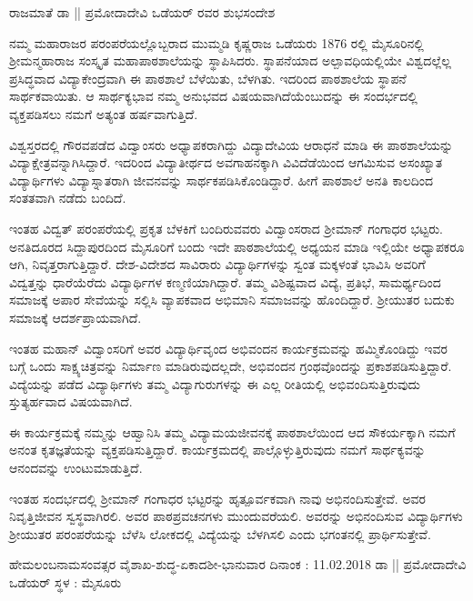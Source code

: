ರಾಜಮಾತೆ ಡಾ || ಪ್ರಮೋದಾದೇವಿ ಒಡೆಯರ್ ರವರ ಶುಭಸಂದೇಶ
	
ನಮ್ಮ ಮಹಾರಾಜರ ಪರಂಪರೆಯಲ್ಲೊಬ್ಬರಾದ ಮುಮ್ಮಡಿ ಕೃಷ್ಣರಾಜ ಒಡೆಯರು 1876 ರಲ್ಲಿ ಮೈಸೂರಿನಲ್ಲಿ ಶ್ರೀಮನ್ಮಹಾರಾಜ ಸಂಸ್ಕೃತ ಮಹಾಪಾಠಶಾಲೆಯನ್ನು ಸ್ಥಾಪಿಸಿದರು. ಸ್ಥಾಪನೆಯಾದ ಅಲ್ಪಾವಧಿಯಲ್ಲಿಯೇ ವಿಶ್ವದಲ್ಲೆಲ್ಲ ಪ್ರಸಿದ್ಧವಾದ ವಿದ್ಯಾಕೇಂದ್ರವಾಗಿ ಈ ಪಾಠಶಾಲೆ ಬೆಳೆಯಿತು, ಬೆಳಗಿತು. ಇದರಿಂದ ಪಾಠಶಾಲೆಯ ಸ್ಥಾಪನೆ ಸಾರ್ಥಕವಾಯಿತು. ಆ ಸಾರ್ಥಕ್ಯಭಾವ ನಮ್ಮ ಅನುಭವದ ವಿಷಯವಾಗಿದೆಯೆಂಬುದನ್ನು ಈ ಸಂದರ್ಭದಲ್ಲಿ ವ್ಯಕ್ತಪಡಿಸಲು ನಮಗೆ ಅತ್ಯಂತ ಹರ್ಷವಾಗುತ್ತಿದೆ.

ವಿಶ್ವಸ್ತರದಲ್ಲಿ ಗೌರವಪಡೆದ ವಿದ್ವಾಂಸರು ಅಧ್ಯಾಪಕರಾಗಿದ್ದು ವಿದ್ಯಾದೇವಿಯ ಆರಾಧನೆ ಮಾಡಿ ಈ ಪಾಠಶಾಲೆಯನ್ನು ವಿದ್ಯಾಕ್ಷೇತ್ರವನ್ನಾಗಿಸಿದ್ದಾರೆ. ಇದರಿಂದ ವಿದ್ಯಾತೀರ್ಥದ ಅವಗಾಹನಕ್ಕಾಗಿ ವಿವಿದೆಡೆಯಿಂದ ಆಗಮಿಸುವ ಅಸಂಖ್ಯಾತ ವಿದ್ಯಾರ್ಥಿಗಳು ವಿದ್ಯಾಸ್ನಾತರಾಗಿ ಜೀವನವನ್ನು ಸಾರ್ಥಕಪಡಿಸಿಕೊಂಡಿದ್ದಾರೆ. ಹೀಗೆ ಪಾಠಶಾಲೆ ಅನತಿ ಕಾಲದಿಂದ ಸಂತತವಾಗಿ ನಡೆದು ಬಂದಿದೆ.

ಇಂತಹ ವಿದ್ವತ್ ಪರಂಪರೆಯಲ್ಲಿ ಪ್ರಕೃತ ಬೆಳಕಿಗೆ ಬಂದಿರುವವರು ವಿದ್ವಾಂಸರಾದ ಶ್ರೀಮಾನ್ ಗಂಗಾಧರ ಭಟ್ಟರು.  ಅನತಿದೂರದ ಸಿದ್ದಾಪುರದಿಂದ ಮೈಸೂರಿಗೆ ಬಂದು ಇದೇ ಪಾಠಶಾಲೆಯಲ್ಲಿ ಅಧ್ಯಯನ ಮಾಡಿ ಇಲ್ಲಿಯೇ ಅಧ್ಯಾಪಕರೂ ಆಗಿ, ನಿವೃತ್ತರಾಗುತ್ತಿದ್ದಾರೆ. ದೇಶ-ವಿದೇಶದ ಸಾವಿರಾರು ವಿದ್ಯಾರ್ಥಿಗಳನ್ನು ಸ್ವಂತ ಮಕ್ಕಳಂತೆ ಭಾವಿಸಿ ಅವರಿಗೆ ವಿದ್ವತ್ತನ್ನು ಧಾರೆಯೆರೆದು ವಿದ್ಯಾರ್ಥಿಗಳ ಕಣ್ಮಣಿಯಾಗಿದ್ದಾರೆ. ತಮ್ಮ ವಿಶಿಷ್ಟವಾದ ವಿದ್ಯೆ, ಪ್ರತಿಭೆ, ಸಾಮರ್ಥ್ಯದಿಂದ ಸಮಾಜಕ್ಕೆ ಅಪಾರ ಸೇವೆಯನ್ನು ಸಲ್ಲಿಸಿ ವ್ಯಾಪಕವಾದ ಅಭಿಮಾನಿ ಸಮಾಜವನ್ನು ಹೊಂದಿದ್ದಾರೆ. ಶ್ರೀಯುತರ ಬದುಕು ಸಮಾಜಕ್ಕೆ ಆದರ್ಶಪ್ರಾಯವಾಗಿದೆ. 

ಇಂತಹ ಮಹಾನ್ ವಿದ್ವಾಂಸರಿಗೆ ಅವರ ವಿದ್ಯಾರ್ಥಿವೃಂದ ಅಭಿವಂದನ ಕಾರ್ಯಕ್ರಮವನ್ನು ಹಮ್ಮಿಕೊಂಡಿದ್ದು ಇವರ ಬಗ್ಗೆ ಒಂದು ಸಾಕ್ಷ್ಯಚಿತ್ರವನ್ನು ನಿರ್ಮಾಣ ಮಾಡಿರುವುದಲ್ಲದೇ, ಅಭಿವಂದನ ಗ್ರಂಥವೊಂದನ್ನು ಪ್ರಕಾಶಪಡಿಸುತ್ತಿದ್ದಾರೆ. ವಿದ್ಯೆಯನ್ನು ಪಡೆದ ವಿದ್ಯಾರ್ಥಿಗಳು ತಮ್ಮ ವಿದ್ಯಾಗುರುಗಳನ್ನು ಈ ಎಲ್ಲ ರೀತಿಯಲ್ಲಿ ಅಭಿವಂದಿಸುತ್ತಿರುವುದು  ಸ್ತುತ್ಯರ್ಹವಾದ ವಿಷಯವಾಗಿದೆ. 

ಈ ಕಾರ್ಯಕ್ರಮಕ್ಕೆ ನಮ್ಮನ್ನು ಆಹ್ವಾನಿಸಿ ತಮ್ಮ ವಿದ್ಯಾಮಯಜೀವನಕ್ಕೆ ಪಾಠಶಾಲೆಯಿಂದ ಆದ ಸೌಕರ್ಯಕ್ಕಾಗಿ ನಮಗೆ ಅನಂತ ಕೃತಜ್ಞತೆಯನ್ನು ವ್ಯಕ್ತಪಡಿಸುತ್ತಿದ್ದಾರೆ. ಕಾರ್ಯಕ್ರಮದಲ್ಲಿ ಪಾಲ್ಗೊಳ್ಳುತ್ತಿರುವುದು ನಮಗೆ ಸಾರ್ಥಕ್ಯವನ್ನು ಆನಂದವನ್ನು ಉಂಟುಮಾಡುತ್ತಿದೆ.

ಇಂತಹ ಸಂದರ್ಭದಲ್ಲಿ ಶ್ರೀಮಾನ್ ಗಂಗಾಧರ ಭಟ್ಟರನ್ನು ಹೃತ್ಪೂರ್ವಕವಾಗಿ ನಾವು ಅಭಿನಂದಿಸುತ್ತೇವೆ. ಅವರ ನಿವೃತ್ತಿಜೀವನ ಸ್ವಸ್ಥವಾಗಿರಲಿ. ಅವರ ಪಾಠಪ್ರವಚನಗಳು ಮುಂದುವರೆಯಲಿ. ಅವರನ್ನು ಅಭಿನಂದಿಸುವ ವಿದ್ಯಾರ್ಥಿಗಳು ಶ್ರೀಯುತರ ಪರಂಪರೆಯನ್ನು ಬೆಳೆಸಿ ಲೋಕದಲ್ಲಿ ವಿದ್ಯೆಯನ್ನು ಬೆಳಗಿಸಲಿ ಎಂದು ಭಗಂತನಲ್ಲಿ ಪ್ರಾರ್ಥಿಸುತ್ತೇವೆ.

ಹೇಮಲಂಬನಾಮಸಂವತ್ಸರ
ವೈಶಾಖ-ಶುದ್ಧ-ಏಕಾದಶೀ-ಭಾನುವಾರ
ದಿನಾಂಕ : 11.02.2018							ಡಾ || ಪ್ರಮೋದಾದೇವಿ ಒಡೆಯರ್
ಸ್ಥಳ : ಮೈಸೂರು
